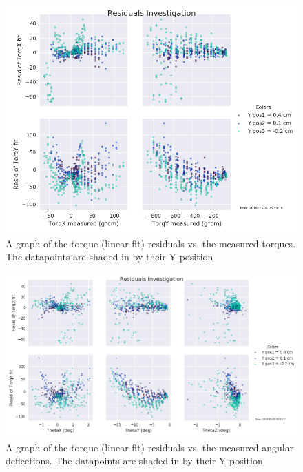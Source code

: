 \documentclass[preprint,12pt,3p]{elsarticle}
\begin{document}
\begin{figure}[H]
\centering
\includegraphics[width=1\textwidth]{images/round1/resids_Torq_coloredY}
\caption{A graph of the torque (linear fit) residuals vs. the measured torques.
The datapoints are shaded in by their Y position}
\end{figure}

\begin{figure}[H]
\centering
\includegraphics[width=1\textwidth]{images/round1/resids_Theta_coloredY.png}
\caption{A graph of the torque (linear fit) residuals vs. the measured angular
    deflections. The datapoints are shaded in by their Y position}
\end{figure}
\end{document}
